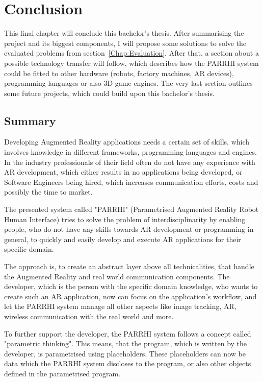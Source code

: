\chapter{Conclusion}\label{Chap:Conclusion}

This final chapter will conclude this bachelor's thesis. After summarising the project and its biggest components, I will propose some solutions to solve the evaluated problems from section~\ref{Chap:Evaluation}. After that, a section about a possible technology transfer will follow, which describes how the PARRHI system could be fitted to other hardware (robots, factory machines, AR devices), programming languages or also 3D game engines. The very last section outlines some future projects, which could build upon this bachelor's thesis.

\section{Summary}

Developing Augmented Reality applications needs a certain set of skills, which involves knowledge in different frameworks, programming languages and engines. In the industry professionals of their field often do not have any experience with AR development, which either results in no applications being developed, or Software Engineers being hired, which increases communication efforts, costs and possibly the time to market. 

The presented system called "PARRHI" (Parametrised Augmented Reality Robot Human Interface) tries to solve the problem of interdisciplinarity by enabling people, who do not have any skills towards AR development or programming in general, to quickly and easily develop and execute AR applications for their specific domain. 

The approach is, to create an abstract layer above all technicalities, that handle the Augmented Reality and real world communication components. The developer, which is the person with the specific domain knowledge, who wants to create such an AR application, now can focus on the application's workflow, and let the PARRHI system manage all other aspects like image tracking, AR, wireless communication with the real world and more.

To further support the developer, the PARRHI system follows a concept called "parametric thinking". This means, that the program, which is written by the developer, is parametrised using placeholders. These placeholders can now be data which the PARRHI system discloses to the program, or also other objects defined in the parametrised program. 

